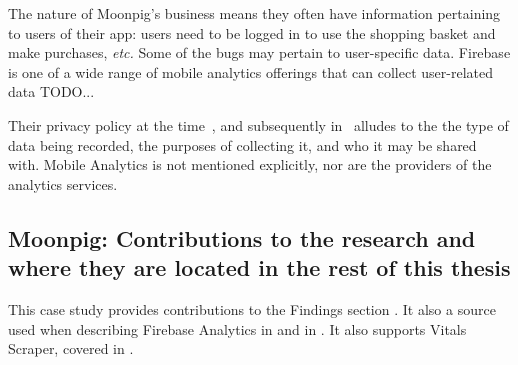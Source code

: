 The nature of Moonpig's business means they often have information pertaining to users of their app: users need to be logged in to use the shopping basket and make purchases, \emph{etc.} 
Some of the bugs may pertain to user-specific data. Firebase is one of a wide range of mobile analytics offerings that can collect user-related data TODO...


Their privacy policy at the time~\citep{moonpig_privacy_policy_2019_feb_21}, and subsequently in~\citep{moonpig_privacy_policy_2021_aug_12} alludes to the the type of data being recorded, the purposes of collecting it, and who it may be shared with. Mobile Analytics is not mentioned explicitly, nor are the providers of the analytics services.



\subsection{Moonpig: Contributions to the research and where they are located in the rest of this thesis}
This case study provides contributions to the Findings section . It also a source used when describing Firebase Analytics in  and in . It also supports Vitals Scraper, covered in . 
